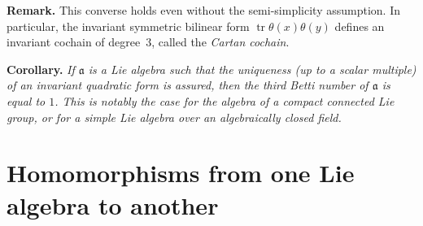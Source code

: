 \documentclass{article}
\newcommand{\fk}{\mathfrak}
\DeclareMathOperator{\tr}{tr}
\begin{document}
\medskip
\textbf{Remark.}
This converse holds even without the semi-simplicity assumption.
In particular, the invariant symmetric bilinear form $\tr\theta(x)\theta(y)$ defines an invariant cochain of degree~$3$, called the \emph{Cartan cochain}.

\medskip
\textbf{Corollary.}
{\itshape
  If $\fk{a}$ is a Lie algebra such that the \emph{uniqueness} (up to a scalar multiple) of an invariant quadratic form is assured, then the third Betti number of $\fk{a}$ is equal to $1$.
  This is notably the case for the algebra of a compact connected Lie group, or for a simple Lie algebra over an algebraically closed field.
}

\section{Homomorphisms from one Lie algebra to another}
\label{II.6}
\end{document}
